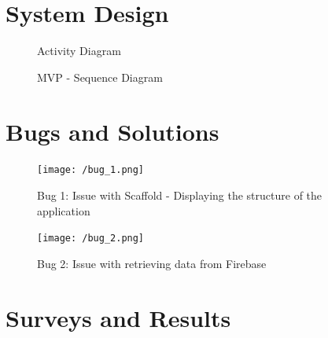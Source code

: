 \documentclass[oneside]{report}
\begin{document}
\appendix
	\chapter{System Design}
		\begin{figure}[H]
			\begin{center}
			\end{center}
			\caption[Activity Diagram]{Activity Diagram}
		\end{figure}

		\begin{figure}[H]
			\begin{center}
			\end{center}
			\caption[MVP - Sequence Diagram]{MVP - Sequence Diagram}
		\end{figure}

	\chapter{Bugs and Solutions}
		\begin{center}
			\begin{figure}[H]
				\texttt{[image: /bug\_1.png]}
				\caption[Bug 1: Issue with Scaffold - Displaying the structure of the application]{Bug 1: Issue with Scaffold - Displaying the structure of the application}
			\end{figure}
			\begin{figure}[H]
				\texttt{[image: /bug\_2.png]}
				\caption[Bug 2: Issue with retrieving data from Firebase]{Bug 2: Issue with retrieving data from Firebase}
			\end{figure}
		\end{center}
	\chapter{Surveys and Results}
\end{document}
